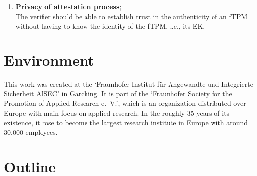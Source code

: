 \begin{enumerate}

  \item{\textbf{Privacy of attestation process};\\
  The verifier should be able to establish trust in the authenticity of an fTPM without having to know the identity of the fTPM, i.e., its EK\@.
  }
\end{enumerate}



\section{Environment}

This work was created at the `Fraunhofer-Institut für Angewandte und Integrierte Sicherheit AISEC' in Garching.
It is part of the `Fraunhofer Society for the Promotion of Applied Research e.~V.', which is an organization distributed over Europe with main focus on applied research.
In the roughly 35 years of its existence, it rose to become the largest research institute in Europe with around 30,000 employees.

\section{Outline}

